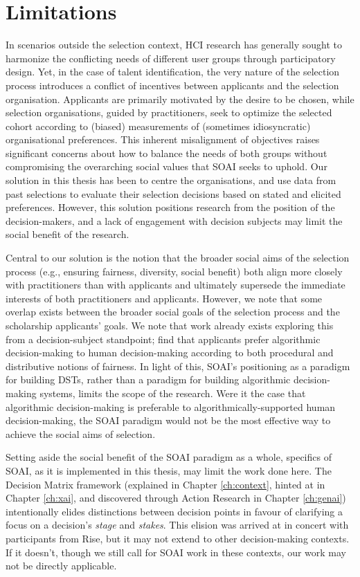 \section{Limitations}
In scenarios outside the selection context, HCI research has generally sought to harmonize the conflicting needs of different user groups through participatory design. Yet, in the case of talent identification, the very nature of the selection process introduces a conflict of incentives between applicants and the selection organisation. Applicants are primarily motivated by the desire to be chosen, while selection organisations, guided by practitioners, seek to optimize the selected cohort according to (biased) measurements of (sometimes idiosyncratic) organisational preferences. This inherent misalignment of objectives raises significant concerns about how to balance the needs of both groups without compromising the overarching social values that SOAI seeks to uphold. Our solution in this thesis has been to centre the organisations, and use data from past selections to evaluate their selection decisions based on stated and elicited preferences. However, this solution positions research from the position of the decision-makers, and a lack of engagement with decision subjects may limit the social benefit of the research.

Central to our solution is the notion that the broader social aims of the selection process (e.g., ensuring fairness, diversity, social benefit) both align more closely with practitioners than with applicants and ultimately supersede the immediate interests of both practitioners and applicants. However, we note that some overlap exists between the broader social goals of the selection process and the scholarship applicants' goals. We note that work already exists exploring this from a decision-subject standpoint; \textcite{10.1145/3351095.3372867} find that applicants prefer algorithmic decision-making to human decision-making according to both procedural and distributive notions of fairness. In light of this, SOAI's positioning as a paradigm for building DSTs, rather than a paradigm for building algorithmic decision-making systems, limits the scope of the research. Were it the case that algorithmic decision-making is preferable to algorithmically-supported human decision-making, the SOAI paradigm would not be the most effective way to achieve the social aims of selection.

Setting aside the social benefit of the SOAI paradigm as a whole, specifics of SOAI, as it is implemented in this thesis, may limit the work done here. The Decision Matrix framework (explained in Chapter \ref{ch:context}, hinted at in Chapter \ref{ch:xai}, and discovered through Action Research in Chapter \ref{ch:genai}) intentionally elides distinctions between decision points in favour of clarifying a focus on a decision's \emph{stage} and \emph{stakes}. This elision was arrived at in concert with participants from Rise, but it may not extend to other decision-making contexts. If it doesn't, though we still call for SOAI work in these contexts, our work may not be directly applicable.

